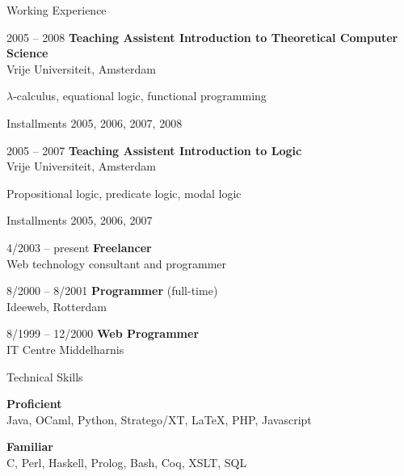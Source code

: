 \documentclass[a4paper,11pt]{article}
\newenvironment{sublist}{%
  \begin{list}{}{%
      \setlength{\itemsep}{0em}\setlength{\parsep}{0em}%
      \setlength{\topsep}{0em}\setlength{\parskip}{0em}%
    }%
}%
{ \end{list} }
\begin{document}
\begin{cv}{}
\begin{cvlist}{Working Experience}
\item[2005 -- 2008]
  {\bf Teaching Assistent Introduction to Theoretical Computer Science}\\
  Vrije Universiteit, Amsterdam
  \begin{sublist}
  \item $\lambda$-calculus, equational logic, functional programming
  \item Installments 2005, 2006, 2007, 2008
  \end{sublist}
\item[2005 -- 2007]
  {\bf Teaching Assistent Introduction to Logic}\\
  Vrije Universiteit, Amsterdam
  \begin{sublist}
  \item Propositional logic, predicate logic, modal logic
  \item Installments 2005, 2006, 2007
  \end{sublist}
\item[4/2003 -- present]
  {\bf Freelancer}\\
  Web technology consultant and programmer
\item[8/2000 -- 8/2001]
  {\bf Programmer} (full-time)\\
  Ideeweb, Rotterdam
\item[8/1999 -- 12/2000]
  {\bf Web Programmer}\\
  IT Centre Middelharnis
\end{cvlist}


\pagebreak


\begin{cvlist}{Technical Skills}
\item
  {\bf Proficient}\\
  Java, OCaml, Python, Stratego/XT, LaTeX, PHP, Javascript
\item
  {\bf Familiar}\\
  C, Perl, Haskell, Prolog, Bash, Coq, XSLT, SQL
\end{cvlist}



\end{cv}
\end{document}
